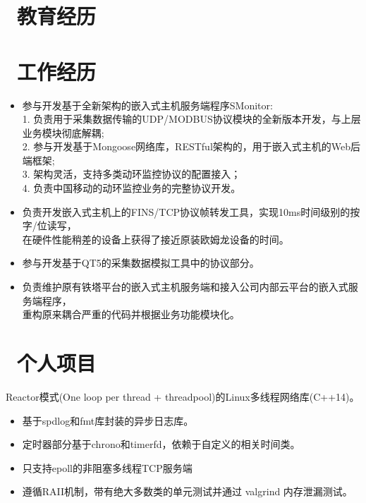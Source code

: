 \documentclass{resume}
\begin{document}



    \section{\faGraduationCap\ 教育经历}

    \section{\faUser\ 工作经历}
            \begin{itemize}
            \item 参与开发基于全新架构的嵌入式主机服务端程序SMonitor: 
            \\1. 负责用于采集数据传输的UDP/MODBUS协议模块的全新版本开发，与上层业务模块彻底解耦; 
            \\2. 参与开发基于Mongoose网络库，RESTful架构的，用于嵌入式主机的Web后端框架;
            \\3. 架构灵活，支持多类动环监控协议的配置接入；
            \\4. 负责中国移动的动环监控业务的完整协议开发。

            \item 负责开发嵌入式主机上的FINS/TCP协议帧转发工具，实现10ms时间级别的按字/位读写，\\在硬件性能稍差的设备上获得了接近原装欧姆龙设备的时间。
            \item 参与开发基于QT5的采集数据模拟工具中的协议部分。
            \item 负责维护原有铁塔平台的嵌入式主机服务端和接入公司内部云平台的嵌入式服务端程序，\\重构原来耦合严重的代码并根据业务功能模块化。
            \end{itemize}

    \section{\faGithubAlt\ 个人项目}
        Reactor模式(One loop per thread + threadpool)的Linux多线程网络库(C++14)。
        \begin{itemize}
            \item 基于spdlog和fmt库封装的异步日志库。
            \item 定时器部分基于chrono和timerfd，依赖于自定义的相关时间类。
            \item 只支持epoll的非阻塞多线程TCP服务端
            \item 遵循RAII机制，带有绝大多数类的单元测试并通过 valgrind 内存泄漏测试。
        \end{itemize}
\end{document}
